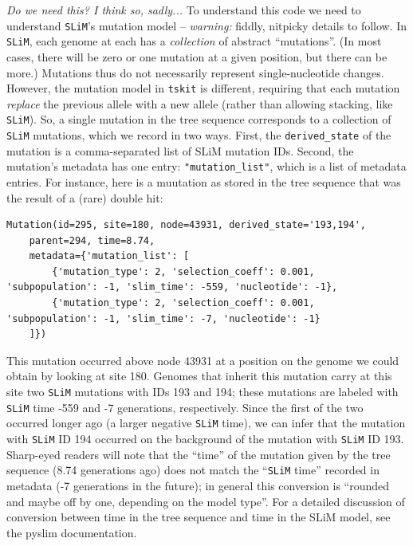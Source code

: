 \documentclass[12pt]{article}
\newcommand{\tskit}[0]{\texttt{tskit}\xspace}
\newcommand{\slim}[0]{\texttt{SLiM}\xspace}
\newcommand{\comment}[1]{\textit{\color{green} #1}}
\begin{document}
\comment{Do we need this? I think so, sadly...}
To understand this code we need to understand \slim's mutation model --
\emph{warning:} fiddly, nitpicky details to follow.
In \slim, each genome at each has a \emph{collection} of abstract ``mutations''.
(In most cases, there will be zero or one mutation at a given position,
but there can be more.)
Mutations thus do not necessarily represent single-nucleotide changes.
However, the mutation model in \tskit is different, requiring that each mutation
\emph{replace} the previous allele with a new allele (rather than allowing stacking, like \slim).
So, a single mutation in the tree sequence corresponds to a collection of \slim mutations,
which we record in two ways.
First, the \verb|derived_state| of the mutation is a comma-separated list of SLiM mutation IDs.
Second, the mutation's metadata has one entry: \verb|"mutation_list"|,
which is a list of metadata entries.
For instance, here is a muutation as stored in the tree sequence
that was the result of a (rare) double hit:
 \begin{verbatim}
Mutation(id=295, site=180, node=43931, derived_state='193,194',
    parent=294, time=8.74,
    metadata={'mutation_list': [
        {'mutation_type': 2, 'selection_coeff': 0.001, 'subpopulation': -1, 'slim_time': -559, 'nucleotide': -1},
        {'mutation_type': 2, 'selection_coeff': 0.001, 'subpopulation': -1, 'slim_time': -7, 'nucleotide': -1}
    ]})
\end{verbatim}

This mutation occurred
above node 43931 at a position on the genome we could obtain by looking at site 180.
Genomes that inherit this mutation carry at this site two \slim mutations with IDs 193 and 194;
these mutations are labeled with \slim time -559 and -7 generations, respectively.
Since the first of the two occurred longer ago (a larger negative \slim time),
we can infer that the mutation with \slim ID 194 occurred on the background
of the mutation with \slim ID 193.
Sharp-eyed readers will note that the ``time'' of the mutation given by the tree sequence
(8.74 generations ago) does not match the ``\slim time'' recorded in metadata
(-7 generations in the future);
in general this conversion is ``rounded and maybe off by one, depending on the model type''.
For a detailed discussion of conversion between time in the tree sequence
and time in the SLiM model, see the pyslim documentation.
\end{document}
